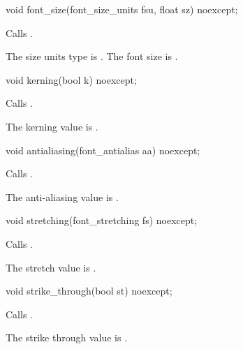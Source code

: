 %
\begin{itemdecl}
void font_size(font_size_units fsu, float sz) noexcept;
\end{itemdecl}
\begin{itemdescr}
\pnum
\effects Calls .

\pnum
\remarks The size units type is . The font size is .
\end{itemdescr}

%
\begin{itemdecl}
void kerning(bool k) noexcept;
\end{itemdecl}
\begin{itemdescr}
\pnum
\effects Calls .

\pnum
\remarks The kerning value is .
\end{itemdescr}

%
\begin{itemdecl}
void antialiasing(font_antialias aa) noexcept;
\end{itemdecl}
\begin{itemdescr}
\pnum
\effects Calls .

\pnum
\remarks The anti-aliasing value is .
\end{itemdescr}

%
\begin{itemdecl}
void stretching(font_stretching fs) noexcept;
\end{itemdecl}
\begin{itemdescr}
\pnum
\effects Calls .

\pnum
\remarks The stretch value is .
\end{itemdescr}

%
\begin{itemdecl}
void strike_through(bool st) noexcept;
\end{itemdecl}
\begin{itemdescr}
\pnum
\effects Calls .

\pnum
\remarks The strike through value is .
\end{itemdescr}

